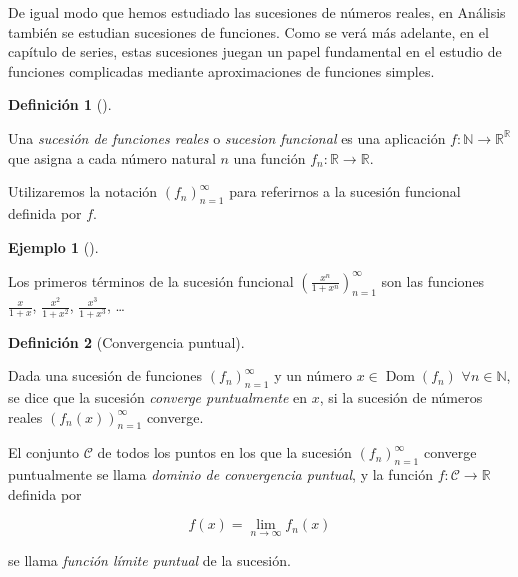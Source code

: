 \documentclass[
  a4paper,
]{scrreport}
\theoremstyle{definition}
\newtheorem{example}{Ejemplo}[chapter]
\theoremstyle{plain}
\theoremstyle{definition}
\newtheorem{definition}{Definición}[chapter]
\theoremstyle{definition}
\theoremstyle{plain}
\theoremstyle{plain}
\theoremstyle{remark}
\begin{document}
De igual modo que hemos estudiado las sucesiones de números reales, en
Análisis también se estudian sucesiones de funciones. Como se verá más
adelante, en el capítulo de series, estas sucesiones juegan un papel
fundamental en el estudio de funciones complicadas mediante
aproximaciones de funciones simples.

\begin{definition}[]\protect\hypertarget{def-sucesion-funciones}{}\label{def-sucesion-funciones}

Una \emph{sucesión de funciones reales} o \emph{sucesion funcional} es
una aplicación \(f:\mathbb{N}\to \mathbb{R}^{\mathbb{R}}\) que asigna a
cada número natural \(n\) una función \(f_n:\mathbb{R}\to\mathbb{R}\).

Utilizaremos la notación \(\left(f_n\right)_{n=1}^\infty\) para
referirnos a la sucesión funcional definida por \(f\).

\end{definition}

\begin{example}[]\protect\hypertarget{exm-sucesion-funciones}{}\label{exm-sucesion-funciones}

Los primeros términos de la sucesión funcional
\(\left(\frac{x^n}{1+x^n}\right)_{n=1}^\infty\) son las funciones
\(\frac{x}{1+x}\), \(\frac{x^2}{1+x^2}\), \(\frac{x^3}{1+x^3}\),
\ldots{}

\end{example}

\begin{definition}[Convergencia
puntual]\protect\hypertarget{def-convergencia-puntual}{}\label{def-convergencia-puntual}

Dada una sucesión de funciones \(\left(f_n\right)_{n=1}^\infty\) y un
número \(x\in\operatorname{Dom}(f_n)\) \(\forall n\in\mathbb{N}\), se
dice que la sucesión \emph{converge puntualmente} en \(x\), si la
sucesión de números reales \((f_n(x))_{n=1}^\infty\) converge.

El conjunto \(\mathcal{C}\) de todos los puntos en los que la sucesión
\(\left(f_n\right)_{n=1}^\infty\) converge puntualmente se llama
\emph{dominio de convergencia puntual}, y la función
\(f:\mathcal{C}\to\mathbb{R}\) definida por

\[
f(x) = \lim_{n\to\infty}f_n(x)
\]

se llama \emph{función límite puntual} de la sucesión.

\end{definition}
\end{document}
